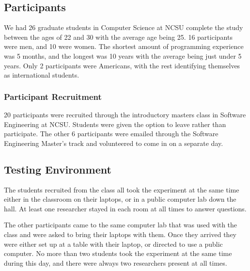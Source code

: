 \documentclass{sig-alternate-05-2015}
\begin{document}
\subsection{Participants}
 We had 26 graduate students in Computer Science at NCSU complete the study between the ages of 22 and 30  with the average age being 25.  16 participants were men, and 10 were women.  The shortest amount of programming experience was 5 months, and the longest was 10 years with the average being just under 5 years.  Only 2 participants were Americans, with the rest identifying themselves as international students.  
 \subsubsection{Participant Recruitment} 20 participants were recruited through the introductory masters class in Software Engineering at NCSU.   Students were given the option to leave rather than participate.  The other 6 participants were emailed through the Software Engineering Master's track and volunteered to come in on a separate day. 
 
 \subsection{Testing Environment}
 The students recruited from the class all took the experiment at the same time either in the classroom on their laptops, or in a public computer lab down the hall. At least one researcher stayed in each room at all times to answer questions.
 
 The other participants came to the same computer lab that was used with the class and were asked to bring their laptops with them.  Once they arrived they were either set up at a table with their laptop, or directed to use a public computer.  No more than two students took the experiment at the same time during this day, and there were always two researchers present at all times.  
 
\end{document}
